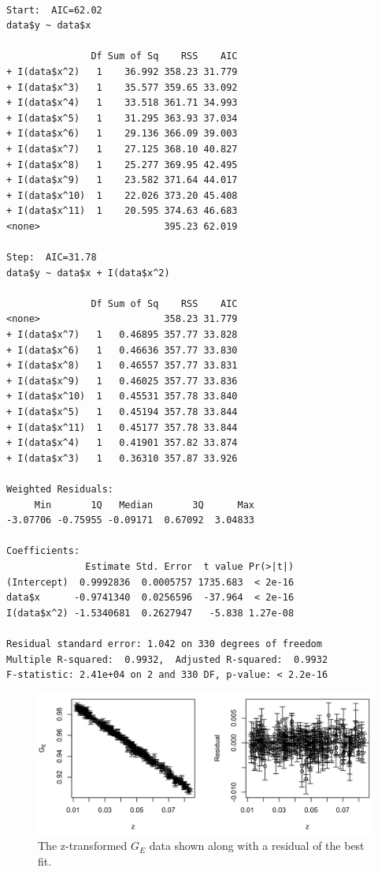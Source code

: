 \documentclass[10pt,aps,prc,twocolumn]{revtex4-1}
\begin{document}
\begin{appendix}
\begin{Verbatim}[fontsize=\footnotesize]

Start:  AIC=62.02
data$y ~ data$x

               Df Sum of Sq    RSS    AIC
+ I(data$x^2)   1    36.992 358.23 31.779
+ I(data$x^3)   1    35.577 359.65 33.092
+ I(data$x^4)   1    33.518 361.71 34.993
+ I(data$x^5)   1    31.295 363.93 37.034
+ I(data$x^6)   1    29.136 366.09 39.003
+ I(data$x^7)   1    27.125 368.10 40.827
+ I(data$x^8)   1    25.277 369.95 42.495
+ I(data$x^9)   1    23.582 371.64 44.017
+ I(data$x^10)  1    22.026 373.20 45.408
+ I(data$x^11)  1    20.595 374.63 46.683
<none>                      395.23 62.019

Step:  AIC=31.78
data$y ~ data$x + I(data$x^2)

               Df Sum of Sq    RSS    AIC
<none>                      358.23 31.779
+ I(data$x^7)   1   0.46895 357.77 33.828
+ I(data$x^6)   1   0.46636 357.77 33.830
+ I(data$x^8)   1   0.46557 357.77 33.831
+ I(data$x^9)   1   0.46025 357.77 33.836
+ I(data$x^10)  1   0.45531 357.78 33.840
+ I(data$x^5)   1   0.45194 357.78 33.844
+ I(data$x^11)  1   0.45177 357.78 33.844
+ I(data$x^4)   1   0.41901 357.82 33.874
+ I(data$x^3)   1   0.36310 357.87 33.926

Weighted Residuals:
     Min       1Q   Median       3Q      Max
-3.07706 -0.75955 -0.09171  0.67092  3.04833

Coefficients:
              Estimate Std. Error  t value Pr(>|t|)
(Intercept)  0.9992836  0.0005757 1735.683  < 2e-16 
data$x      -0.9741340  0.0256596  -37.964  < 2e-16 
I(data$x^2) -1.5340681  0.2627947   -5.838 1.27e-08 

Residual standard error: 1.042 on 330 degrees of freedom
Multiple R-squared:  0.9932,  Adjusted R-squared:  0.9932
F-statistic: 2.41e+04 on 2 and 330 DF, p-value: < 2.2e-16

\end{Verbatim}

\begin{figure}[htb]
\includegraphics[width=\columnwidth]{Figure/ztransform-R-fit.png}
\caption{The z-transformed $G_E$ data shown along with a residual of the best fit.}
\end{figure}


\end{appendix}
\end{document}
